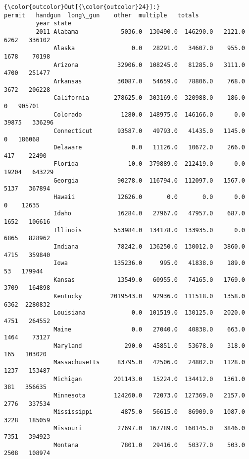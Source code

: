 \documentclass[11pt]{article}
\begin{document}
\begin{Verbatim}[commandchars=\\\{\}]
{\color{outcolor}Out[{\color{outcolor}24}]:}                         permit   handgun  long\_gun    other  multiple   totals
         year state                                                                    
         2011 Alabama            5036.0  130490.0  146290.0   2121.0      6262   336102
              Alaska                0.0   28291.0   34607.0    955.0      1678    70198
              Arizona           32906.0  108245.0   81285.0   3111.0      4700   251477
              Arkansas          30087.0   54659.0   78806.0    768.0      3672   206228
              California       278625.0  303169.0  320988.0    186.0         0   905701
              Colorado           1280.0  148975.0  146166.0      0.0     39875   336296
              Connecticut       93587.0   49793.0   41435.0   1145.0         0   186068
              Delaware              0.0   11126.0   10672.0    266.0       417    22490
              Florida              10.0  379889.0  212419.0      0.0     19204   643229
              Georgia           90278.0  116794.0  112097.0   1567.0      5137   367894
              Hawaii            12626.0       0.0       0.0      0.0         0    12635
              Idaho             16284.0   27967.0   47957.0    687.0      1652   106616
              Illinois         553984.0  134178.0  133935.0      0.0      6865   828962
              Indiana           78242.0  136250.0  130012.0   3860.0      4715   359840
              Iowa             135236.0     995.0   41838.0    189.0        53   179944
              Kansas            13549.0   60955.0   74165.0   1769.0      3709   164898
              Kentucky        2019543.0   92936.0  111518.0   1358.0      6362  2280832
              Louisiana             0.0  101519.0  130125.0   2020.0      4751   264552
              Maine                 0.0   27040.0   40838.0    663.0      1464    73127
              Maryland            290.0   45851.0   53678.0    318.0       165   103020
              Massachusetts     83795.0   42506.0   24802.0   1128.0      1237   153487
              Michigan         201143.0   15224.0  134412.0   1361.0       381   356635
              Minnesota        124260.0   72073.0  127369.0   2157.0      2776   337534
              Mississippi        4875.0   56615.0   86909.0   1087.0      3228   185059
              Missouri          27697.0  167789.0  160145.0   3846.0      7351   394923
              Montana            7801.0   29416.0   50377.0    503.0      2508   108974

\end{Verbatim}
\end{document}
